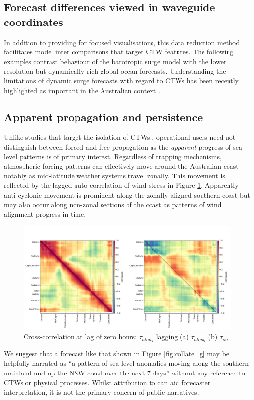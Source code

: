 \subsection{Forecast differences viewed in waveguide coordinates}

In addition to providing for focused visualisations, this data reduction method facilitates model inter comparisons that target CTW features.
The following examples contrast behaviour of the barotropic surge model with the lower resolution but dynamically rich global ocean forecasts.
Understanding the limitations of dynamic surge forecasts with regard to CTWs has been recently highlighted as important in the Australian context \citep{Hetzel:2018hh}.   


\subsection{ Apparent propagation and persistence }
Unlike studies that target the isolation of CTWs \citep{Maiwa:2010tk}, operational users need not distinguish between forced and free propagation as the \emph{apparent} progress of sea level patterns is of primary interest.
Regardless of trapping mechanisms, atmospheric forcing patterns can effectively move around the Australian coast - notably as mid-latitude weather systems travel zonally. 
This movement is reflected by the lagged auto-correlation of wind stress in Figure \ref{fig:Clag0U}.
Apparently anti-cyclonic movement is prominent along the zonally-aligned southern coast but may also occur along non-zonal sections of the coast as patterns of wind alignment progress in time. 
\begin{figure}[H]\centering
    \noindent\includegraphics[width=\figwidthBig]{figures/plots/concatC_U_gstr_lag_000.png}
    \caption[Cross-correlation at lag of zero hours $\tau_{along}$]{
             Cross-correlation at lag of zero hours: 
             $\tau_{along}$ lagging (a) $\tau_{along}$ (b) $\tau_{on}$}
    \label{fig:Clag0U}
\end{figure}
We suggest that a forecast like that shown in Figure \ref{fig:collate_g} may be helpfully narrated as ``a pattern of sea level anomalies moving along the southern mainland and up the NSW coast over the next 7 days'' without any reference to CTWs or physical processes.
Whilst attribution to can aid forecaster interpretation, it is not the primary concern of public narratives.   
 
